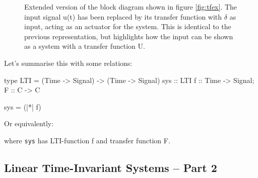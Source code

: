 \begin{figure}[H]
\centering
{}
\caption{Extended version of the block diagram shown in figure \ref{fig:tfex}. The input signal u(t) has been replaced by its transfer function with $\delta$ as input, acting as an actuator for the system. This is identical to the previous representation, but highlights how the input can be shown as a system with a transfer function U.}
\label{fig:tfexext}
\end{figure}
Let's summarise this with some relations: 
\begin{codeeq}
type LTI = (Time -> Signal) -> (Time -> Signal)
sys :: LTI
f :: Time -> Signal; F :: C -> C
\end{codeeq}
\begin{codeeq}
sys = (|*| f)
\end{codeeq}
Or equivalently:
where \texttt{sys} has LTI-function f and transfer function F.

\subsection{Linear Time-Invariant Systems -- Part 2}\label{sec:lti}

